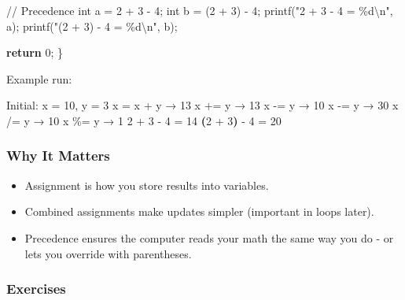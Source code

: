 \documentclass[
  letterpaper,
  DIV=11,
  numbers=noendperiod]{scrreprt}
\newenvironment{Shaded}{\begin{snugshade}}{\end{snugshade}}
\newcommand{\AttributeTok}[1]{\textcolor[rgb]{0.40,0.45,0.13}{#1}}
\newcommand{\CommentTok}[1]{\textcolor[rgb]{0.37,0.37,0.37}{#1}}
\newcommand{\ControlFlowTok}[1]{\textcolor[rgb]{0.00,0.23,0.31}{\textbf{#1}}}
\newcommand{\DataTypeTok}[1]{\textcolor[rgb]{0.68,0.00,0.00}{#1}}
\newcommand{\DecValTok}[1]{\textcolor[rgb]{0.68,0.00,0.00}{#1}}
\newcommand{\ExtensionTok}[1]{\textcolor[rgb]{0.00,0.23,0.31}{#1}}
\newcommand{\KeywordTok}[1]{\textcolor[rgb]{0.00,0.23,0.31}{\textbf{#1}}}
\newcommand{\NormalTok}[1]{\textcolor[rgb]{0.00,0.23,0.31}{#1}}
\newcommand{\OperatorTok}[1]{\textcolor[rgb]{0.37,0.37,0.37}{#1}}
\newcommand{\SpecialCharTok}[1]{\textcolor[rgb]{0.37,0.37,0.37}{#1}}
\newcommand{\StringTok}[1]{\textcolor[rgb]{0.13,0.47,0.30}{#1}}
\providecommand{\tightlist}{%
  \setlength{\itemsep}{0pt}\setlength{\parskip}{0pt}}
\begin{document}
\begin{Shaded}
\begin{Highlighting}[]
    \CommentTok{// Precedence}
    \DataTypeTok{int}\NormalTok{ a }\OperatorTok{=} \DecValTok{2} \OperatorTok{+} \DecValTok{3} \OperatorTok{{-}} \DecValTok{4}\OperatorTok{;}
    \DataTypeTok{int}\NormalTok{ b }\OperatorTok{=} \OperatorTok{(}\DecValTok{2} \OperatorTok{+} \DecValTok{3}\OperatorTok{)} \OperatorTok{{-}} \DecValTok{4}\OperatorTok{;}
\NormalTok{    printf}\OperatorTok{(}\StringTok{"2 + 3 {-} 4 = }\SpecialCharTok{\%d\textbackslash{}n}\StringTok{"}\OperatorTok{,}\NormalTok{ a}\OperatorTok{);}
\NormalTok{    printf}\OperatorTok{(}\StringTok{"(2 + 3) {-} 4 = }\SpecialCharTok{\%d\textbackslash{}n}\StringTok{"}\OperatorTok{,}\NormalTok{ b}\OperatorTok{);}

    \ControlFlowTok{return} \DecValTok{0}\OperatorTok{;}
\OperatorTok{\}}
\end{Highlighting}
\end{Shaded}

Example run:

\begin{Shaded}
\begin{Highlighting}[]
\ExtensionTok{Initial:}\NormalTok{ x = 10, y = 3}
\ExtensionTok{x}\NormalTok{ = x + y → 13}
\ExtensionTok{x}\NormalTok{ += y → 13}
\ExtensionTok{x} \AttributeTok{{-}}\OperatorTok{=}\NormalTok{ y → 10}
\ExtensionTok{x} \AttributeTok{{-}}\OperatorTok{=}\NormalTok{ y → 30}
\ExtensionTok{x}\NormalTok{ /= y → 10}
\ExtensionTok{x}\NormalTok{ \%= y → 1}
\ExtensionTok{2}\NormalTok{ + 3 }\AttributeTok{{-}}\NormalTok{ 4 = 14}
\KeywordTok{(}\ExtensionTok{2}\NormalTok{ + 3}\KeywordTok{)} \ExtensionTok{{-}}\NormalTok{ 4 = 20}
\end{Highlighting}
\end{Shaded}

\subsubsection{Why It Matters}\label{why-it-matters-11}

\begin{itemize}
\tightlist
\item
  Assignment is how you store results into variables.
\item
  Combined assignments make updates simpler (important in loops later).
\item
  Precedence ensures the computer reads your math the same way you do -
  or lets you override with parentheses.
\end{itemize}

\subsubsection{Exercises}\label{exercises-11}
\end{document}
